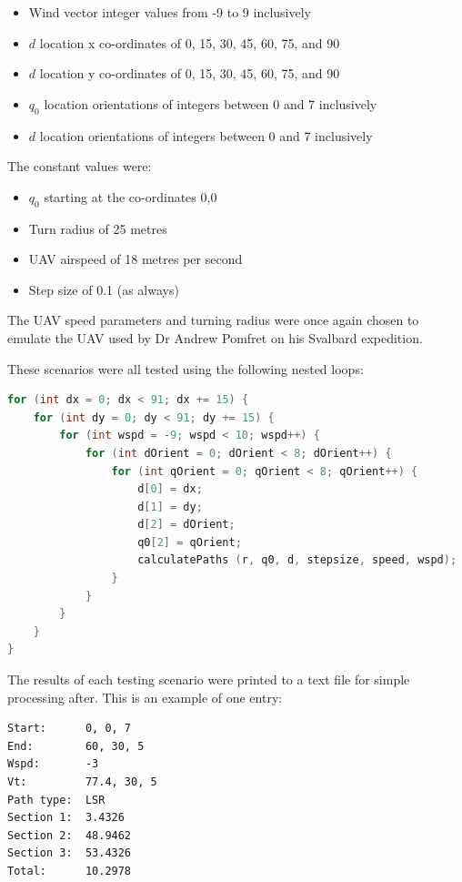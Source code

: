 \begin{itemize}
	\item Wind vector integer values from -9 to 9 inclusively
	\item $d$ location x co-ordinates of 0, 15, 30, 45, 60, 75, and 90
	\item $d$ location y co-ordinates of 0, 15, 30, 45, 60, 75, and 90
	\item $q_0$ location orientations of integers between 0 and 7 inclusively
	\item $d$ location orientations of integers between 0 and 7 inclusively
\end{itemize}

The constant values were:
\begin{itemize}
 	\item $q_0$ starting at the co-ordinates 0,0
 	\item Turn radius of 25 metres
 	\item UAV airspeed of 18 metres per second
 	\item Step size of 0.1 (as always)
 \end{itemize} 

 The UAV speed parameters and turning radius were once again chosen to emulate the UAV used by Dr Andrew Pomfret on his Svalbard expedition.

These scenarios were all tested using the following nested loops:

\begin{minipage}{\linewidth}
\begin{lstlisting}[language=C++]
for (int dx = 0; dx < 91; dx += 15) {
    for (int dy = 0; dy < 91; dy += 15) {
        for (int wspd = -9; wspd < 10; wspd++) {
            for (int dOrient = 0; dOrient < 8; dOrient++) {
                for (int qOrient = 0; qOrient < 8; qOrient++) {
                    d[0] = dx;
                    d[1] = dy;
                    d[2] = dOrient;
                    q0[2] = qOrient;
                    calculatePaths (r, q0, d, stepsize, speed, wspd);
                }
            }
        }
    }
}
\end{lstlisting}
\end{minipage}

The results of each testing scenario were printed to a text file for simple processing after. This is an example of one entry:

\begin{minipage}{\linewidth}
\begin{lstlisting}[language={}]
Start: 		0, 0, 7
End: 		60, 30, 5
Wspd: 		-3
Vt:  		77.4, 30, 5
Path type: 	LSR
Section 1: 	3.4326
Section 2: 	48.9462
Section 3: 	53.4326
Total: 		10.2978
\end{lstlisting}
\end{minipage}

